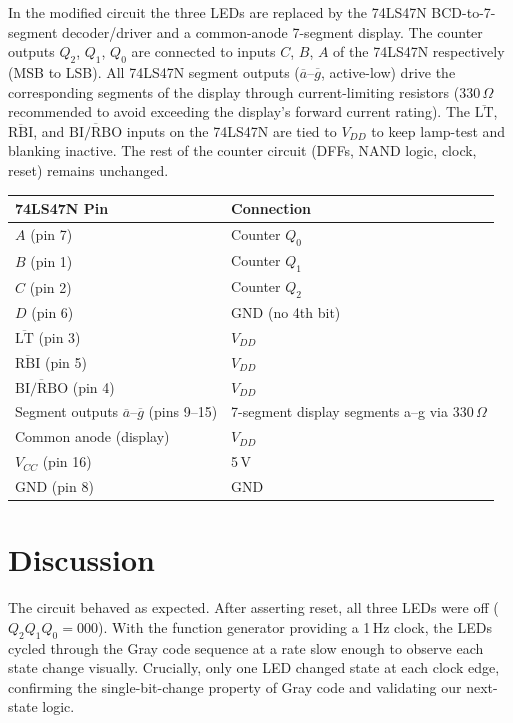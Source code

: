 \documentclass[12pt, letterpaper]{article}
\begin{document}
In the modified circuit the three LEDs are replaced by the 74LS47N BCD-to-7-segment
decoder/driver and a common-anode 7-segment display.  The counter outputs $Q_2$, $Q_1$,
$Q_0$ are connected to inputs $C$, $B$, $A$ of the 74LS47N respectively (MSB to LSB).
All 74LS47N segment outputs ($\overline{a}$–$\overline{g}$, active-low) drive the
corresponding segments of the display through current-limiting resistors (330\,$\Omega$
recommended to avoid exceeding the display's forward current rating).  The $\overline{\text{LT}}$,
$\overline{\text{RBI}}$, and $\overline{\text{BI/RBO}}$ inputs on the 74LS47N are tied to
$V_{DD}$ to keep lamp-test and blanking inactive.  The rest of the counter circuit
(DFFs, NAND logic, clock, reset) remains unchanged.

\begin{center}
\small
\begin{tabular}{ll}
  \toprule
  \textbf{74LS47N Pin} & \textbf{Connection} \\
  \midrule
  $A$ (pin 7)          & Counter $Q_0$ \\
  $B$ (pin 1)          & Counter $Q_1$ \\
  $C$ (pin 2)          & Counter $Q_2$ \\
  $D$ (pin 6)          & GND (no 4th bit) \\
  $\overline{\text{LT}}$ (pin 3)  & $V_{DD}$ \\
  $\overline{\text{RBI}}$ (pin 5) & $V_{DD}$ \\
  $\overline{\text{BI/RBO}}$ (pin 4) & $V_{DD}$ \\
  Segment outputs $\overline{a}$--$\overline{g}$ (pins 9--15) & 7-segment display segments a--g via 330\,$\Omega$ \\
  Common anode (display) & $V_{DD}$ \\
  $V_{CC}$ (pin 16)    & 5\,V \\
  GND (pin 8)          & GND \\
  \bottomrule
\end{tabular}
\end{center}

\section{Discussion}

The circuit behaved as expected.  After asserting reset, all three LEDs were off
($Q_2Q_1Q_0 = 000$).  With the function generator providing a 1\,Hz clock, the LEDs
cycled through the Gray code sequence at a rate slow enough to observe each state change
visually.  Crucially, only one LED changed state at each clock edge, confirming the
single-bit-change property of Gray code and validating our next-state logic.
\end{document}
